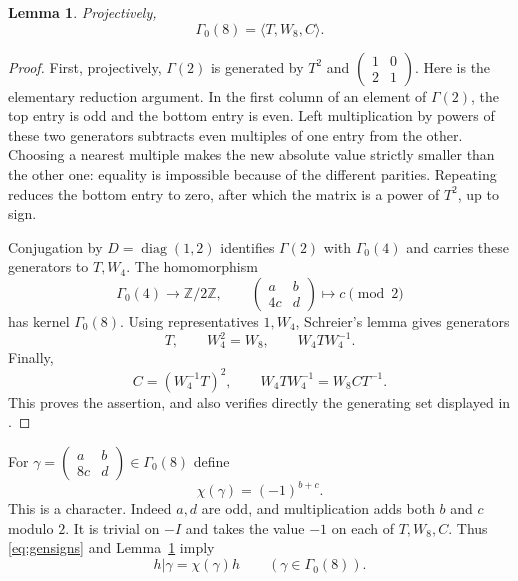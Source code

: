 \documentclass[11pt]{article}
\newtheorem{lemma}[theorem]{Lemma}
\theoremstyle{remark}
\begin{document}
\begin{lemma}\label{lem:generators}
Projectively,
\[
 \Gamma_0(8)=\langle T,W_8,C\rangle.
\]
\end{lemma}
\begin{proof}
First, projectively, $\Gamma(2)$ is generated by
$T^2$ and $\left(\begin{smallmatrix}1&0\\2&1\end{smallmatrix}\right)$.
Here is the elementary reduction argument. In the first column of an
element of $\Gamma(2)$, the top entry is odd and the bottom entry is
even. Left multiplication by powers of these two generators subtracts
even multiples of one entry from the other. Choosing a nearest multiple
makes the new absolute value strictly smaller than the other one:
equality is impossible because of the different parities. Repeating
reduces the bottom entry to zero, after which the matrix is a power of
$T^2$, up to sign.

Conjugation by $D=\operatorname{diag}(1,2)$ identifies $\Gamma(2)$
with $\Gamma_0(4)$ and carries these generators to $T,W_4$.
The homomorphism
\[
 \Gamma_0(4)\longrightarrow\mathbb Z/2\mathbb Z,
 \qquad
 \begin{pmatrix}a&b\\4c&d\end{pmatrix}\longmapsto c\pmod2
\]
has kernel $\Gamma_0(8)$. Using representatives $1,W_4$, Schreier's
lemma gives generators
\[
 T,\qquad W_4^2=W_8,\qquad W_4TW_4^{-1}.
\]
Finally,
\[
 C=(W_4^{-1}T)^2,\qquad
 W_4TW_4^{-1}=W_8CT^{-1}.
\]
This proves the assertion, and also verifies directly the generating
set displayed in \cite[Section~2]{CF}.
\end{proof}

For $\gamma=\left(\begin{smallmatrix}a&b\\8c&d\end{smallmatrix}\right)
\in\Gamma_0(8)$ define
\begin{equation}\label{eq:chi}
 \chi(\gamma)=(-1)^{b+c}.
\end{equation}
This is a character. Indeed $a,d$ are odd, and multiplication adds
both $b$ and $c$ modulo $2$. It is trivial on $-I$ and takes the value
$-1$ on each of $T,W_8,C$. Thus \eqref{eq:gensigns} and
Lemma~\ref{lem:generators} imply
\begin{equation}\label{eq:charlaw}
 h|\gamma=\chi(\gamma)h\qquad(\gamma\in\Gamma_0(8)).
\end{equation}
\end{document}
